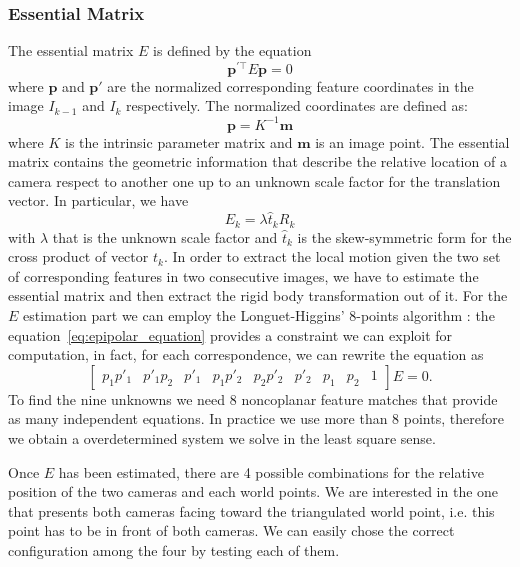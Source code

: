 \subsubsection{Essential Matrix}
\label{subsec:essential_matrix}
The essential matrix $E$ is defined by the equation
\begin{equation}
\label{eq:epipolar_equation}
\mathbf{p}^{\prime\top} E \mathbf{p} = 0
\end{equation}
\noindent where $\mathbf{p}$ and $\mathbf{p}'$ are the normalized corresponding 
feature coordinates in the image $I_{k-1}$ and $I_{k}$ respectively.
The normalized coordinates are defined as:
\begin{equation}
	\mathbf{p} = K^{-1} \mathbf{m}
\end{equation}
\noindent where $K$ is the intrinsic parameter matrix and $\mathbf{m}$ is an
image point.
The essential matrix contains the geometric information that describe the 
relative location of a camera respect to another one up to an unknown scale factor 
for the translation vector. In particular, we have
\begin{equation*}
	E_k = \lambda \hat{t}_kR_k
\end{equation*}
\noindent with $\lambda$ that is the unknown scale factor and $\hat{t}_k$ is 
the skew-symmetric form for the cross product of vector $t_k$.
In order to extract the local motion given the two set of corresponding features
in two consecutive images, we have to estimate the essential matrix and then 
extract the rigid body transformation out of it.
For the $E$ estimation part we can employ the Longuet-Higgins' 8-points 
algorithm \cite{longuet1981computer}: the equation~\ref{eq:epipolar_equation} 
provides a constraint we
can exploit for computation, in fact, for each correspondence, we can rewrite 
the equation as
\begin{equation*}
	\begin{bmatrix}
		p_1p'_1 & p'_1p_2 & p'_1 & p_1p'_2 & p_2p'_2 & p'_2 & p_1 & p_2 & 1
	\end{bmatrix}
	E = 0	\text{.}
\end{equation*}
To find the nine unknowns we need 8 noncoplanar feature matches that provide as many 
independent equations.
In practice we use more than 8 points, therefore we obtain a overdetermined 
system we solve in the least square sense.

Once $E$ has been estimated, there are 4 possible combinations for the relative 
position of the two cameras and each world points. We are interested in the one
that presents both cameras facing toward the triangulated world point,
i.e. this point has to be in front of both cameras. We can easily chose the 
correct configuration among the four by testing each of them.


